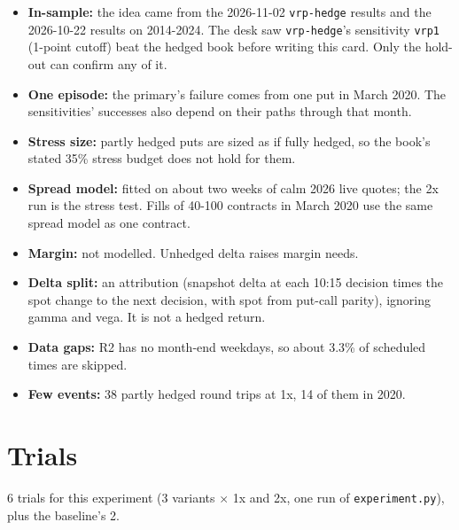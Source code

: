 \documentclass{article}
\begin{document}
\begin{itemize}

\item \textbf{In-sample:} the idea came from the 2026-11-02 \texttt{vrp-\allowbreak{}hedge} results and the 2026-10-22 results on 2014-2024. The desk saw \texttt{vrp-\allowbreak{}hedge}'s sensitivity \texttt{vrp1} (1-point cutoff) beat the hedged book before writing this card. Only the hold-out can confirm any of it.

\item \textbf{One episode:} the primary's failure comes from one put in March 2020. The sensitivities' successes also depend on their paths through that month.

\item \textbf{Stress size:} partly hedged puts are sized as if fully hedged, so the book's stated 35\% stress budget does not hold for them.

\item \textbf{Spread model:} fitted on about two weeks of calm 2026 live quotes; the 2x run is the stress test. Fills of 40-100 contracts in March 2020 use the same spread model as one contract.

\item \textbf{Margin:} not modelled. Unhedged delta raises margin needs.

\item \textbf{Delta split:} an attribution (snapshot delta at each 10:15 decision times the spot change to the next decision, with spot from put-call parity), ignoring gamma and vega. It is not a hedged return.

\item \textbf{Data gaps:} R2 has no month-end weekdays, so about 3.3\% of scheduled times are skipped.

\item \textbf{Few events:} 38 partly hedged round trips at 1x, 14 of them in 2020.

\end{itemize}

\section{Trials}

6 trials for this experiment (3 variants \ensuremath{\times} 1x and 2x, one run of \texttt{experiment.\allowbreak{}py}), plus the baseline's 2.
\end{document}
